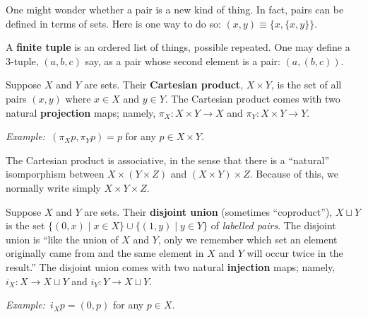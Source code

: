 \documentclass[10pt, a4paper, twocolumn]{article}
\newcommand{\defn}[1]{\textbf{\textsf{#1}}}
\newcommand{\eg}{\emph{Example:}\relax}
\begin{document}
One might wonder
whether a pair is a new kind of thing. In fact, pairs can be
defined in terms of sets. Here is one way to do so: $(x, y)\equiv \{x, \{x,y\}\}$.

A \defn{finite tuple} is an ordered list of things, possible repeated. One may
define a 3-tuple, $(a, b, c)$ say, as a pair whose second element is a pair:
$(a, (b, c))$. 

Suppose $X$ and $Y$ are sets. Their \defn{Cartesian product}, $X \times Y$, is the
set of all pairs $(x, y)$ where $x \in X$ and $y \in Y$. The Cartesian product comes
with two natural \defn{projection} maps; namely, $\pi_X : X \times Y \to X$ and $\pi_Y : X
\times Y \to Y$.

\eg\ $(\pi_X p, \pi_Y p) = p$ for any $p \in X \times Y$.

The Cartesian product is associative, in the sense that there is a
``natural'' isomporphism between $X \times (Y \times Z)$ and $(X
\times Y) \times Z$. Because of this, we normally write simply $X
\times Y \times Z$.

Suppose $X$ and $Y$ are sets. Their \defn{disjoint union} (sometimes
“coproduct”), $X \sqcup Y$ is the set $\{(0, x) \mid x \in X\} \cup \{(1, y) \mid y \in Y\}$ of
\emph{labelled pairs}. The disjoint union is “like the union of $X$
and $Y$, only we remember which set an element originally came from
and the same element in $X$ and $Y$ will occur twice in the result.”
The disjoint union comes with two natural \defn{injection} maps;
namely, $i_X : X \to X \sqcup Y$ and $i_Y : Y \to X \sqcup Y$.

\eg\ $i_X p = (0, p)$ for any $p \in X$.
\end{document}
